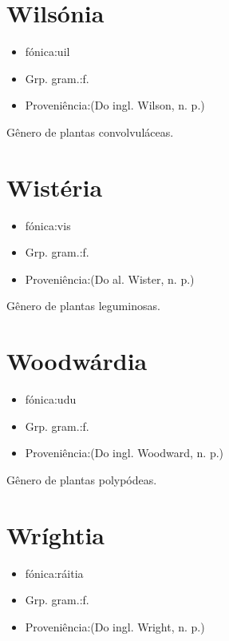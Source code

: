 \documentclass{article}
\begin{document}
\section{Wilsónia}
\begin{itemize}
\item {fónica:uil}
\end{itemize}
\begin{itemize}
\item {Grp. gram.:f.}
\end{itemize}
\begin{itemize}
\item {Proveniência:(Do ingl. \textunderscore Wilson\textunderscore , n. p.)}
\end{itemize}
Gênero de plantas convolvuláceas.
\section{Wistéria}
\begin{itemize}
\item {fónica:vis}
\end{itemize}
\begin{itemize}
\item {Grp. gram.:f.}
\end{itemize}
\begin{itemize}
\item {Proveniência:(Do al. \textunderscore Wister\textunderscore , n. p.)}
\end{itemize}
Gênero de plantas leguminosas.
\section{Woodwárdia}
\begin{itemize}
\item {fónica:udu}
\end{itemize}
\begin{itemize}
\item {Grp. gram.:f.}
\end{itemize}
\begin{itemize}
\item {Proveniência:(Do ingl. \textunderscore Woodward\textunderscore , n. p.)}
\end{itemize}
Gênero de plantas polypódeas.
\section{Wríghtia}
\begin{itemize}
\item {fónica:ráitia}
\end{itemize}
\begin{itemize}
\item {Grp. gram.:f.}
\end{itemize}
\begin{itemize}
\item {Proveniência:(Do ingl. \textunderscore Wright\textunderscore , n. p.)}
\end{itemize}
\end{document}
